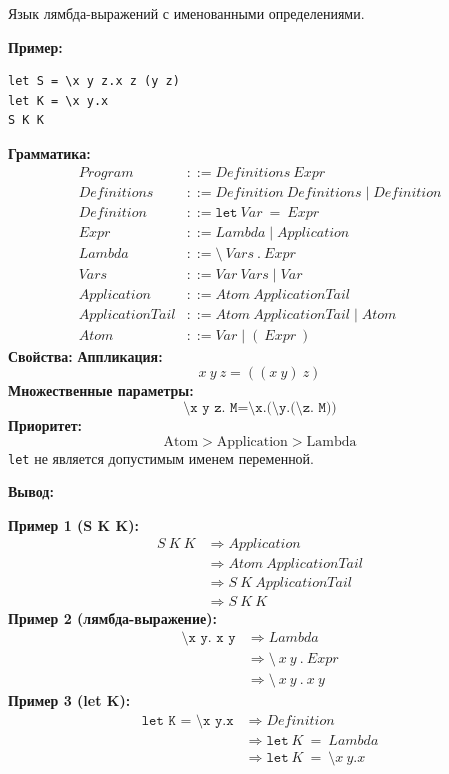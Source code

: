 \documentclass{article}
\begin{document}
Язык лямбда-выражений с именованными определениями.

\textbf{Пример:}
\begin{verbatim}
let S = \x y z.x z (y z)
let K = \x y.x
S K K
\end{verbatim}
\textbf{Грамматика:}
\[\begin{aligned}
Program &::= Definitions\ Expr \\
Definitions &::= Definition\ Definitions \mid Definition \\
Definition &::= \texttt{let}\ Var\ =\ Expr \\
Expr &::= Lambda \mid Application \\
Lambda &::= \texttt{\textbackslash}\ Vars\ .\ Expr \\
Vars &::= Var\ Vars \mid Var \\
Application &::= Atom\ ApplicationTail \\
ApplicationTail &::= Atom\ ApplicationTail \mid Atom \\
Atom &::= Var \mid (\ Expr\ )
\end{aligned}\]
\textbf{Свойства:}
\textbf{Аппликация:}
\[x\ y\ z = ((x\ y)\ z)\]
\textbf{Множественные параметры:}
\[\texttt{\textbackslash x y z. M}=
\texttt{\textbackslash x.(\textbackslash y.(\textbackslash z. M))}\]
\textbf{Приоритет:}
\[\text{Atom} > \text{Application} > \text{Lambda}\]
\texttt{let} не является допустимым именем переменной.

\textbf{Вывод:}

\textbf{Пример 1 (S K K):}
\[\begin{aligned}
S\ K\ K
&\Rightarrow Application \\
&\Rightarrow Atom\ ApplicationTail \\
&\Rightarrow S\ K\ ApplicationTail \\
&\Rightarrow S\ K\ K
\end{aligned}\]
\vspace{0.5em}
\textbf{Пример 2 (лямбда-выражение):}
\[\begin{aligned}
\texttt{\textbackslash x y. x y}
&\Rightarrow Lambda \\
&\Rightarrow \texttt{\textbackslash}\ x\ y\ .\ Expr \\
&\Rightarrow \texttt{\textbackslash}\ x\ y\ .\ x\ y
\end{aligned}\]
\vspace{0.5em}
\textbf{Пример 3 (let K):}
\[\begin{aligned}
\texttt{let K = \textbackslash x y.x}
&\Rightarrow Definition \\
&\Rightarrow \texttt{let}\ K\ =\ Lambda \\
&\Rightarrow \texttt{let}\ K\ =\ \texttt{\textbackslash} x\ y . x
\end{aligned}\]
\end{document}
